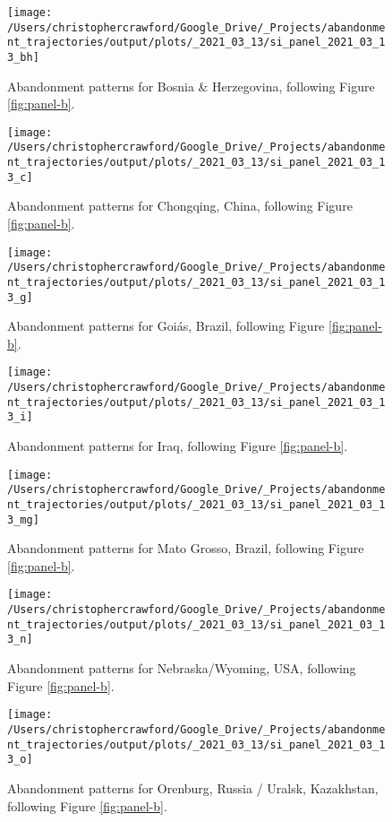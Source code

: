 \documentclass[9pt,twoside,lineno]{pnas-new}
\begin{document}
\begin{figure}
\texttt{[image: /Users/christophercrawford/Google\_Drive/\_Projects/abandonment\_trajectories/output/plots/\_2021\_03\_13/si\_panel\_2021\_03\_13\_bh]} \caption{Abandonment patterns for Bosnia \& Herzegovina, following Figure \ref{fig:panel-b}.}\label{fig:panel-bh}
\end{figure}

\begin{figure}
\texttt{[image: /Users/christophercrawford/Google\_Drive/\_Projects/abandonment\_trajectories/output/plots/\_2021\_03\_13/si\_panel\_2021\_03\_13\_c]} \caption{Abandonment patterns for Chongqing, China, following Figure \ref{fig:panel-b}.}\label{fig:panel-c}
\end{figure}

\begin{figure}
\texttt{[image: /Users/christophercrawford/Google\_Drive/\_Projects/abandonment\_trajectories/output/plots/\_2021\_03\_13/si\_panel\_2021\_03\_13\_g]} \caption{Abandonment patterns for Goiás, Brazil, following Figure \ref{fig:panel-b}.}\label{fig:panel-g}
\end{figure}

\begin{figure}
\texttt{[image: /Users/christophercrawford/Google\_Drive/\_Projects/abandonment\_trajectories/output/plots/\_2021\_03\_13/si\_panel\_2021\_03\_13\_i]} \caption{Abandonment patterns for Iraq, following Figure \ref{fig:panel-b}.}\label{fig:panel-i}
\end{figure}

\begin{figure}
\texttt{[image: /Users/christophercrawford/Google\_Drive/\_Projects/abandonment\_trajectories/output/plots/\_2021\_03\_13/si\_panel\_2021\_03\_13\_mg]} \caption{Abandonment patterns for Mato Grosso, Brazil, following Figure \ref{fig:panel-b}.}\label{fig:panel-mg}
\end{figure}

\begin{figure}
\texttt{[image: /Users/christophercrawford/Google\_Drive/\_Projects/abandonment\_trajectories/output/plots/\_2021\_03\_13/si\_panel\_2021\_03\_13\_n]} \caption{Abandonment patterns for Nebraska/Wyoming, USA, following Figure \ref{fig:panel-b}.}\label{fig:panel-n}
\end{figure}

\begin{figure}
\texttt{[image: /Users/christophercrawford/Google\_Drive/\_Projects/abandonment\_trajectories/output/plots/\_2021\_03\_13/si\_panel\_2021\_03\_13\_o]} \caption{Abandonment patterns for Orenburg, Russia / Uralsk, Kazakhstan, following Figure \ref{fig:panel-b}.}\label{fig:panel-o}
\end{figure}
\end{document}
